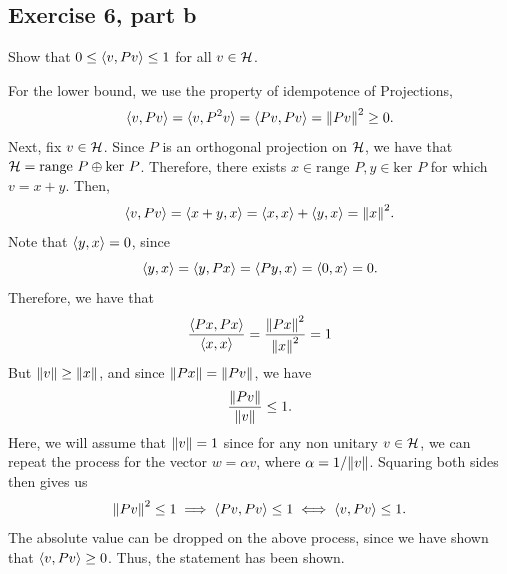 \renewcommand{\ker}{\text{ker }}

\renewcommand{\range}{\text{range }}
\newpage
\subsection{Exercise 6, part b}
Show that $0 \leq \langle v, Pv \rangle \leq 1$ for all $v \in \mathcal{H}$. 
\partbreak
\begin{solution}

    For the lower bound, we use the property of idempotence of Projections,
    \[\langle v, Pv \rangle = \langle v, P^2 v \rangle = \langle Pv, Pv \rangle = \norm{Pv}^2 \geq 0.\]
    Next, fix $v \in \mathcal{H}$. Since $P$ is an orthogonal projection on $\mathcal{H}$, we have that $\scH = \range P \oplus  \ker P$. Therefore, there exists $x \in \range P, y \in \ker P$ for which $v = x + y$. Then, 
    \[\langle v, Pv \rangle = \langle x+y, x \rangle = \langle x, x \rangle + \langle y, x \rangle = \norm{x}^2.\]
    Note that $\langle y, x \rangle = 0$, since 
    \[\langle y, x \rangle = \langle y, Px \rangle = \langle Py, x \rangle = \langle 0, x \rangle = 0.\]
    Therefore, we have that
    \[\frac{\langle Px, Px \rangle}{\langle x, x \rangle} = \frac{\norm{Px}^2}{\norm{x}^2}= 1\]
    But $\norm{v} \geq \norm{x}$, and since $\norm{Px} = \norm{Pv}$, we have
    \[\frac{\norm{Pv}}{\norm{v}} \leq 1. \]
    Here, we will assume that $\norm{v} = 1$ since for any non unitary $v \in \mathcal{H}$, we can repeat the process for the vector $w = \alpha v$, where $\alpha = 1/\norm{v}$. Squaring both sides then gives us
    \[\norm{Pv}^2 \leq 1 \implies \langle Pv, Pv \rangle \leq 1 \iff \langle v, Pv \rangle \leq 1.\]
    The absolute value can be dropped on the above process, since we have shown that $\langle v, Pv \rangle \geq 0$. Thus, the statement has been shown.
\end{solution}


\newpage
